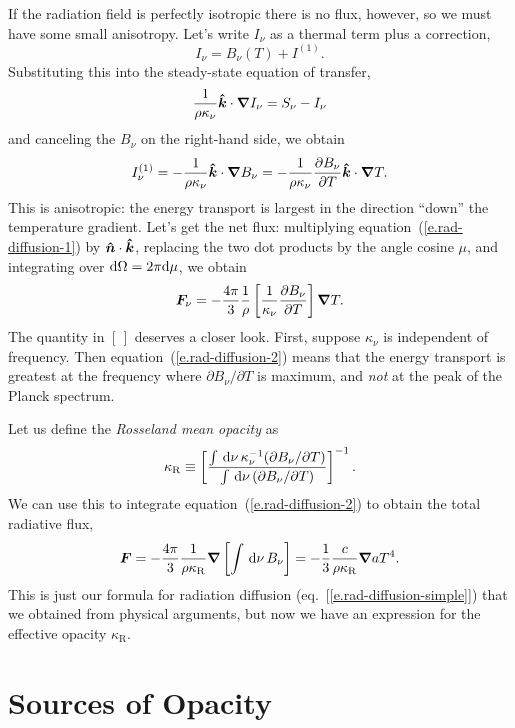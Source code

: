 If the radiation field is perfectly isotropic there is no flux, however, so we must have some small anisotropy. Let's write $I_{\nu}$ as a thermal term plus a correction, 
\[ I_{\nu} = B_{\nu}(T) + I^{(1)}. \]
Substituting this into the steady-state equation of transfer,
\[ \frac{1}{\rho\kappa_{\nu}}\boldsymbol{\hat{k}}\cdot\boldsymbol{\nabla} I_{\nu}  = S_{\nu} - I_{\nu}\]
and canceling the $B_{\nu}$ on the right-hand side, we obtain
\begin{equation}\label{e.rad-diffusion-1}
I_{\nu}^{(1)} = -\frac{1}{\rho\kappa_{\nu}} \boldsymbol{\hat{k}}\cdot\boldsymbol{\nabla} B_{\nu} = -\frac{1}{\rho\kappa_{\nu}} \frac{\partial B_{\nu}}{\partial T} \boldsymbol{\hat{k}}\cdot\boldsymbol{\nabla} T.
\end{equation}
This is anisotropic: the energy transport is largest in the direction ``down'' the temperature gradient. Let's get the net flux: multiplying equation~(\ref{e.rad-diffusion-1}) by $\boldsymbol{\hat{n}}\cdot\boldsymbol{\hat{k}}$, replacing the two dot products by the angle cosine $\mu$, and integrating over $\mathrm{d} \Omega = 2\pi \mathrm{d}\mu$, we obtain
\begin{equation}\label{e.rad-diffusion-2}
\boldsymbol{F}_{\nu} = -\frac{4\pi}{3}\frac{1}{\rho}\left[\frac{1}{\kappa_{\nu}}\frac{\partial B_{\nu}}{\partial T}\right]\boldsymbol{\nabla} T.
\end{equation}
The quantity in $[\,]$ deserves a closer look. First, suppose $\kappa_{\nu}$ is independent of frequency. Then equation~(\ref{e.rad-diffusion-2}) means that the energy transport is greatest at the frequency where $\partial B_{\nu}/\partial T$ is maximum, and \emph{not} at the peak of the Planck spectrum. 

Let us define the \emph{Rosseland mean opacity} as
\[ \kappa_{\mathrm{R}} \equiv \left[\frac{\int\,\mathrm{d}\nu\,\kappa_{\nu}^{-1}(\partial B_{\nu}/\partial T)}{\int \,\mathrm{d}\nu\, (\partial B_{\nu}/\partial T)}\right]^{-1}. \]
We can use this to integrate equation~(\ref{e.rad-diffusion-2}) to obtain the total radiative flux,
\begin{equation}\label{e.rad-flux}
\boldsymbol{F} = - \frac{4\pi}{3} \frac{1}{\rho\kappa_{\mathrm{R}}} \boldsymbol{\nabla}\left[\int\,\mathrm{d}\nu\,B_{\nu}\right] = - \frac{1}{3} \frac{c}{\rho\kappa_{\mathrm{R}}} \boldsymbol{\nabla} aT^{4}.
\end{equation}
This is just our formula for radiation diffusion (eq.~[\ref{e.rad-diffusion-simple}]) that we obtained from physical arguments, but now we have an expression for the effective opacity $\kappa_{\mathrm{R}}$.

\section{Sources of Opacity}\label{s.opacity-sources}

